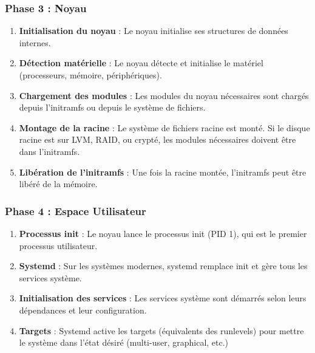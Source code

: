 \documentclass[12pt,a4paper]{article}
\begin{document}
\subsubsection{Phase 3 : Noyau}

\begin{enumerate}
    \item \textbf{Initialisation du noyau} : Le noyau initialise ses structures de données internes.
    
    \item \textbf{Détection matérielle} : Le noyau détecte et initialise le matériel (processeurs, mémoire, périphériques).
    
    \item \textbf{Chargement des modules} : Les modules du noyau nécessaires sont chargés depuis l'initramfs ou depuis le système de fichiers.
    
    \item \textbf{Montage de la racine} : Le système de fichiers racine est monté. Si le disque racine est sur LVM, RAID, ou crypté, les modules nécessaires doivent être dans l'initramfs.
    
    \item \textbf{Libération de l'initramfs} : Une fois la racine montée, l'initramfs peut être libéré de la mémoire.
\end{enumerate}

\subsubsection{Phase 4 : Espace Utilisateur}

\begin{enumerate}
    \item \textbf{Processus init} : Le noyau lance le processus init (PID 1), qui est le premier processus utilisateur.
    
    \item \textbf{Systemd} : Sur les systèmes modernes, systemd remplace init et gère tous les services système.
    
    \item \textbf{Initialisation des services} : Les services système sont démarrés selon leurs dépendances et leur configuration.
    
    \item \textbf{Targets} : Systemd active les targets (équivalents des runlevels) pour mettre le système dans l'état désiré (multi-user, graphical, etc.)
\end{enumerate}
\end{document}
